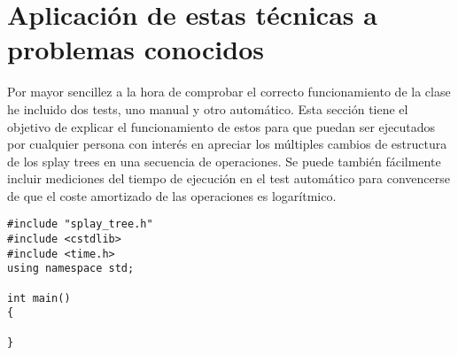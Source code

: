 \documentclass[letterpaper,12pt]{article}
\begin{document}
\newpage
\appendix
\section{Aplicación de estas técnicas a problemas conocidos}
Por mayor sencillez a la hora de comprobar el correcto funcionamiento de la 
clase he incluido dos tests, uno manual y otro automático. Esta sección tiene
el objetivo de explicar el funcionamiento de estos para que puedan ser 
ejecutados por cualquier persona con interés en apreciar los múltiples cambios
de estructura de los splay trees en una secuencia de operaciones. Se puede
también fácilmente incluir mediciones del tiempo de ejecución en el test 
automático para convencerse de que el coste amortizado de las operaciones es 
logarítmico.


\begin{lstlisting}
#include "splay_tree.h"
#include <cstdlib>
#include <time.h>
using namespace std;

int main()
{

}
\end{lstlisting}


\newpage
\end{document}
